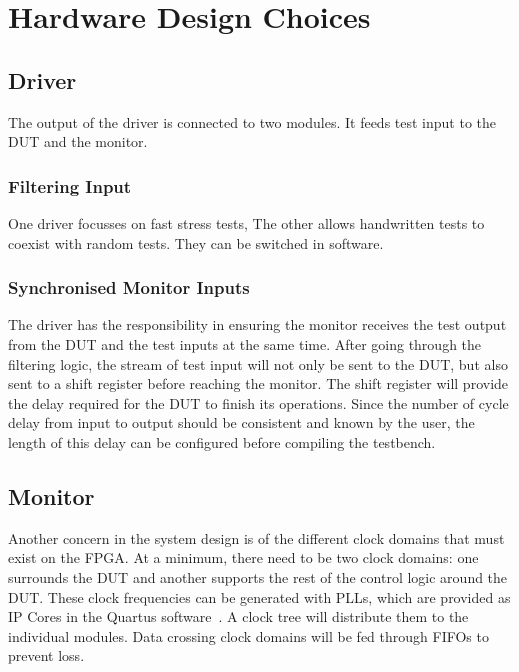 \section{Hardware Design Choices}



\subsection{Driver}

The output of the driver is connected to two modules.
It feeds test input to the DUT and the monitor.

\subsubsection{Filtering Input}
One driver focusses on fast stress tests, The other allows handwritten tests to coexist with random tests.
They can be switched in software.

\subsubsection{Synchronised Monitor Inputs}
The driver has the responsibility in ensuring the monitor receives the test output from the DUT and the test inputs at the same time.
After going through the filtering logic, the stream of test input will not only be sent to the DUT, but also sent to a shift register before reaching the monitor.
The shift register will provide the delay required for the DUT to finish its operations.
Since the number of cycle delay from input to output should be consistent and known by the user, the length of this delay can be configured before compiling the testbench.


\subsection{Monitor}

Another concern in the system design is of the different clock domains that must exist on the FPGA.
At a minimum, there need to be two clock domains: one surrounds the DUT and another supports the rest of the control logic around the DUT.
These clock frequencies can be generated with PLLs, which are provided as IP Cores in the Quartus software~\cite{Altera4}.
A clock tree will distribute them to the individual modules.
Data crossing clock domains will be fed through FIFOs to prevent loss.

